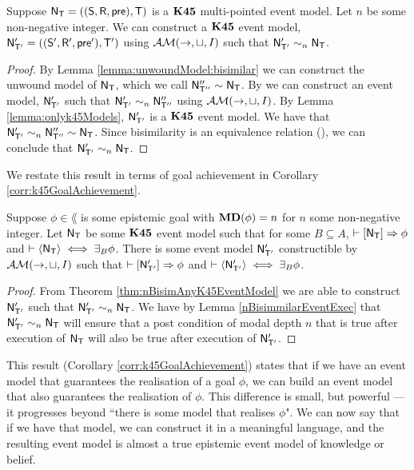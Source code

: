 \begin{thm} \label{thm:nBisimAnyK45EventModel}
  Suppose $\mathrm{\mathsf{N}}_\mathrm{\mathsf{T}} = ((\mathrm{\mathsf{S}},\mathrm{\mathsf{R}},\mathrm{\mathsf{pre}}),\mathrm{\mathsf{T}})$ is a $\bf K45$ multi-pointed
  event model.
  Let $n$ be some non-negative integer.
  We can construct a $\bf K45$ event model, $\mathrm{\mathsf{N}}'_{\mathrm{\mathsf{T}}'} =
  ((\mathrm{\mathsf{S}}',\mathrm{\mathsf{R}}',\mathrm{\mathsf{pre}}'),\mathrm{\mathsf{T}}')$ using
  $\mathcal{AM}(\to,\sqcup,I)$ such that $\mathrm{\mathsf{N}}'_{\mathrm{\mathsf{T}}'} \sim_n \mathrm{\mathsf{N}}_\mathrm{\mathsf{T}}$.
\end{thm}
\begin{proof}
  By Lemma \ref{lemma:unwoundModel:bisimilar} we can construct the unwound model
  of $\mathrm{\mathsf{N}}_\mathrm{\mathsf{T}}$, which we call $\mathrm{\mathsf{N}}''_{\mathrm{\mathsf{T}}''} \sim \mathrm{\mathsf{N}}_{\mathrm{\mathsf{T}}}$.
  By \FIXME we can construct an event model, $\mathrm{\mathsf{N}}'_{\mathrm{\mathsf{T}}'}$ such that
  $\mathrm{\mathsf{N}}'_{\mathrm{\mathsf{T}}'} \sim_n \mathrm{\mathsf{N}}''_{\mathrm{\mathsf{T}}''}$ \FIXME using $\mathcal{AM}(\to,\sqcup,I)$.
  By Lemma \ref{lemma:onlyk45Models}, $\mathrm{\mathsf{N}}'_{\mathrm{\mathsf{T}}'}$ is a $\bf K45$ event model.
  We have that $\mathrm{\mathsf{N}}'_{\mathrm{\mathsf{T}}'} \sim_n \mathrm{\mathsf{N}}''_{\mathrm{\mathsf{T}}''} \sim \mathrm{\mathsf{N}}_\mathrm{\mathsf{T}}$.
  Since bisimilarity is an equivalence relation (\FIXME), we can conclude that
  $\mathrm{\mathsf{N}}'_{\mathrm{\mathsf{T}}'} \sim_n \mathrm{\mathsf{N}}_\mathrm{\mathsf{T}}$.
\end{proof}

We restate this result in terms of goal achievement in Corollary
\ref{corr:k45GoalAchievement}.

\begin{corr} \label{corr:k45GoalAchievement}
  Suppose $\phi \in \lang$ is some epistemic goal with ${\bf MD}(\phi) = n$ for $n$
  some non-negative integer.
  Let $\mathrm{\mathsf{N}}_\mathrm{\mathsf{T}}$ be some $\bf K45$ event model such that for some $B
  \subseteq A$, $\vdash [{\mathrm{\mathsf{N}}_\mathrm{\mathsf{T}}}] \Rightarrow \phi$ and $\vdash
  \langle { \ensuremath {\mathrm{\mathsf{N}}} _ \ensuremath {\mathrm{\mathsf{T}}} } \rangle \iff \exists_B \phi$.
  There is some event model $\mathrm{\mathsf{N}}'_{\mathrm{\mathsf{T}}'}$ constructible by $\mathcal{AM}(\to,\sqcup,I)$
  such that $\vdash [{\mathrm{\mathsf{N}}'_{\mathrm{\mathsf{T}}'}}] \Rightarrow \phi$ and $\vdash
  \langle { \ensuremath {\mathrm{\mathsf{N}}} '_{ \ensuremath {\mathrm{\mathsf{T}}} '}} \rangle \iff \exists_B \phi$.
\end{corr}
\begin{proof}
  From Theorem \ref{thm:nBisimAnyK45EventModel} we are able to construct
  $\mathrm{\mathsf{N}}'_{\mathrm{\mathsf{T}}'}$ such that $\mathrm{\mathsf{N}}'_{\mathrm{\mathsf{T}}'} \sim_n \mathrm{\mathsf{N}}_\mathrm{\mathsf{T}}$.
  We have by Lemma \ref{nBisimmilarEventExec} that $\mathrm{\mathsf{N}}'_{\mathrm{\mathsf{T}}'} \sim_n
  \mathrm{\mathsf{N}}_\mathrm{\mathsf{T}}$ will ensure that a post condition of modal depth $n$ that is true
  after execution of $\mathrm{\mathsf{N}}_\mathrm{\mathsf{T}}$ will also be true after execution of
  $\mathrm{\mathsf{N}}'_{\mathrm{\mathsf{T}}'}$.
\end{proof}

This result (Corollary \ref{corr:k45GoalAchievement}) states
that if we have an event model that guarantees the realisation of a goal $\phi$, we can build an event
model that also guarantees the realisation of $\phi$.
This difference is small, but powerful --- it progresses beyond ``there is some model that realises
$\phi$".
We can now say that if we have that model, we can construct it in a meaningful language, and the
resulting event model is almost a true epistemic event model of knowledge or belief.

